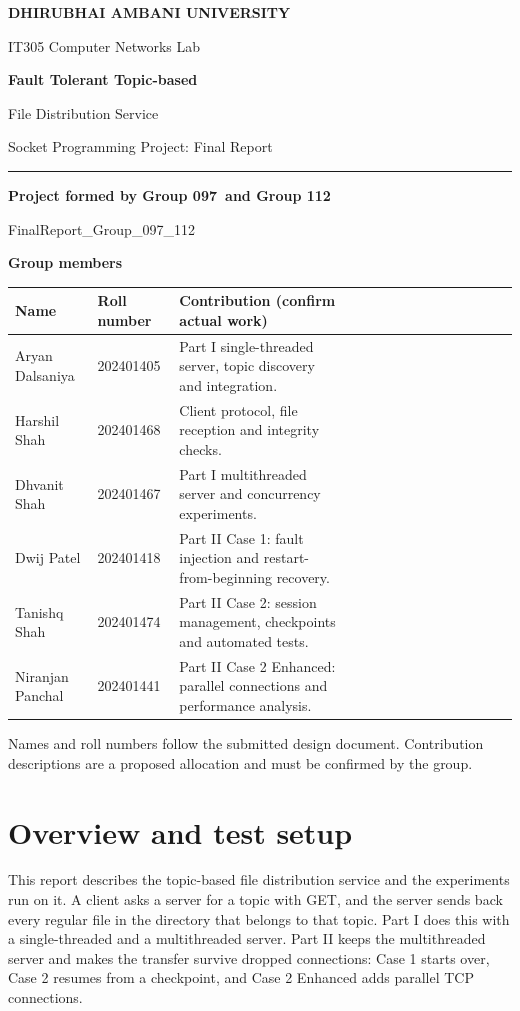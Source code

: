 \documentclass[11pt,a4paper]{article}
\newcommand{\hdr}{\rowcolor{tablehead}\bfseries}
\newcommand{\rowend}{\\\hline}
\newcommand{\nextpage}{\newpage}
\renewcommand{\arraystretch}{1.3}
\newcommand{\GroupOne}{097}
\newcommand{\GroupTwo}{112}
\newcommand{\MemberOne}{Aryan Dalsaniya}
\newcommand{\RollOne}{202401405}
\newcommand{\MemberTwo}{Harshil Shah}
\newcommand{\RollTwo}{202401468}
\newcommand{\MemberThree}{Dhvanit Shah}
\newcommand{\RollThree}{202401467}
\newcommand{\MemberFour}{Dwij Patel}
\newcommand{\RollFour}{202401418}
\newcommand{\MemberFive}{Tanishq Shah}
\newcommand{\RollFive}{202401474}
\newcommand{\MemberSix}{Niranjan Panchal}
\newcommand{\RollSix}{202401441}
\newcommand{\RoleOne}{Part I single-threaded server, topic discovery and integration.}
\newcommand{\RoleTwo}{Client protocol, file reception and integrity checks.}
\newcommand{\RoleThree}{Part I multithreaded server and concurrency experiments.}
\newcommand{\RoleFour}{Part II Case 1: fault injection and restart-from-beginning recovery.}
\newcommand{\RoleFive}{Part II Case 2: session management, checkpoints and automated tests.}
\newcommand{\RoleSix}{Part II Case 2 Enhanced: parallel connections and performance analysis.}
\begin{document}
\thispagestyle{empty}
\begin{center}
\vspace*{2mm}
{\large\bfseries\color{muted}DHIRUBHAI AMBANI UNIVERSITY\par}
\vspace{4mm}
{\large\color{muted}IT305 Computer Networks Lab\par}
\vspace{10mm}
{\fontsize{24}{31}\selectfont\bfseries\color{heading}Fault Tolerant Topic-based\par File Distribution Service\par}
\vspace{6mm}
{\large Socket Programming Project: Final Report\par}
\vspace{4mm}
{\color{heading}\rule{\linewidth}{0.7pt}\par}
\vspace{6mm}
{\bfseries Project formed by Group \GroupOne\ and Group \GroupTwo\par}
\vspace{2mm}
{\ttfamily\small\color{muted}FinalReport\_Group\_\GroupOne\_\GroupTwo\par}
\end{center}
\vspace{5mm}
{\bfseries\color{heading}Group members}\par
\smallskip
{\small\renewcommand{\arraystretch}{1.25}
\begin{tabularx}{\linewidth}{|P{32mm}|P{24mm}|Y|}\hline
\hdr Name & \bfseries Roll number & \bfseries Contribution (confirm actual work)\rowend
\rule{0pt}{11mm}\MemberOne & \RollOne & \RoleOne\rowend
\rule{0pt}{11mm}\MemberTwo & \RollTwo & \RoleTwo\rowend
\rule{0pt}{11mm}\MemberThree & \RollThree & \RoleThree\rowend
\rule{0pt}{11mm}\MemberFour & \RollFour & \RoleFour\rowend
\rule{0pt}{11mm}\MemberFive & \RollFive & \RoleFive\rowend
\rule{0pt}{11mm}\MemberSix & \RollSix & \RoleSix\rowend
\end{tabularx}}
\smallskip
{\footnotesize\color{muted}Names and roll numbers follow the submitted design document. Contribution descriptions are a proposed allocation and must be confirmed by the group.}

\nextpage
\section{Overview and test setup}
This report describes the topic-based file distribution service and the experiments run on it. A client asks a server for a topic with GET, and the server sends back every regular file in the directory that belongs to that topic. Part I does this with a single-threaded and a multithreaded server. Part II keeps the multithreaded server and makes the transfer survive dropped connections: Case 1 starts over, Case 2 resumes from a checkpoint, and Case 2 Enhanced adds parallel TCP connections.
\end{document}
